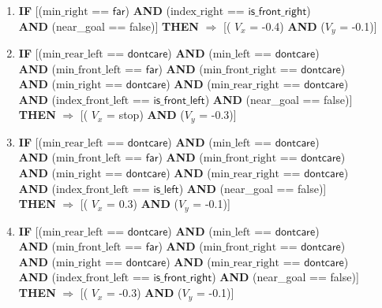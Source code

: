 \begin{enumerate}
	\item \textbf{IF} [($\text{min\_right}$ == $\textsf{far}$) \textbf{AND} ($\text{index\_right}$ == $\textsf{is\_front\_right}$)\\
	\textbf{AND} (near\_goal == \textsf{false})]
	\textbf{THEN} $\Rightarrow$ [( $V_x$ = \textsf{-0.4}) \textbf{AND} ($V_y$ = \textsf{-0.1})]
	
	\item \textbf{IF} [($\text{min\_rear\_left}$ == $\textsf{dontcare}$) 
	\textbf{AND} ($\text{min\_left}$ == $\textsf{dontcare}$)\\
	\textbf{AND} ($\text{min\_front\_left}$ == $\textsf{far}$)
	\textbf{AND} ($\text{min\_front\_right}$ == $\textsf{dontcare}$)\\
	\textbf{AND} ($\text{min\_right}$ == $\textsf{dontcare}$) 
	\textbf{AND} ($\text{min\_rear\_right}$ == $\textsf{dontcare}$) \\
	\textbf{AND} ($\text{index\_front\_left}$ == $\textsf{is\_front\_left}$)
	\textbf{AND} (near\_goal == \textsf{false})]\\
	\textbf{THEN} $\Rightarrow$ [( $V_x$ = \textsf{stop}) \textbf{AND} ($V_y$ = \textsf{-0.3})]

	\item \textbf{IF} [($\text{min\_rear\_left}$ == $\textsf{dontcare}$) 
	\textbf{AND} ($\text{min\_left}$ == $\textsf{dontcare}$)\\
	\textbf{AND} ($\text{min\_front\_left}$ == $\textsf{far}$)
	\textbf{AND} ($\text{min\_front\_right}$ == $\textsf{dontcare}$)\\
	\textbf{AND} ($\text{min\_right}$ == $\textsf{dontcare}$) 
	\textbf{AND} ($\text{min\_rear\_right}$ == $\textsf{dontcare}$) \\
	\textbf{AND} ($\text{index\_front\_left}$ == $\textsf{is\_left}$)
	\textbf{AND} (near\_goal == \textsf{false})]\\
	\textbf{THEN} $\Rightarrow$ [( $V_x$ = \textsf{0.3}) \textbf{AND} ($V_y$ = \textsf{-0.1})]
	
	\item \textbf{IF} [($\text{min\_rear\_left}$ == $\textsf{dontcare}$) 
	\textbf{AND} ($\text{min\_left}$ == $\textsf{dontcare}$)\\
	\textbf{AND} ($\text{min\_front\_left}$ == $\textsf{far}$)
	\textbf{AND} ($\text{min\_front\_right}$ == $\textsf{dontcare}$)\\
	\textbf{AND} ($\text{min\_right}$ == $\textsf{dontcare}$) 
	\textbf{AND} ($\text{min\_rear\_right}$ == $\textsf{dontcare}$) \\
	\textbf{AND} ($\text{index\_front\_left}$ == $\textsf{is\_front\_right}$)
	\textbf{AND} (near\_goal == \textsf{false})]\\
	\textbf{THEN} $\Rightarrow$ [( $V_x$ = \textsf{-0.3}) \textbf{AND} ($V_y$ = \textsf{-0.1})]
	

\end{enumerate}
